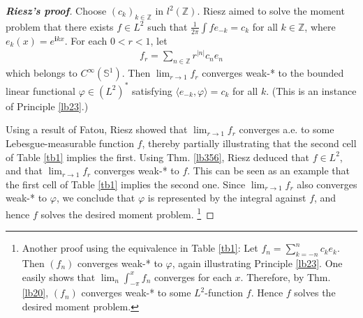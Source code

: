\documentclass[12pt,b5paper,notitlepage]{article}
\theoremstyle{definition}
\theoremstyle{plain}
\newcommand{\bk}[1]{\langle {#1}\rangle}
\newcommand{\im}{\mathbf{i}}
\newcommand{\Zbb}{\mathbb Z}
\newcommand{\Sbb}{{\mathbb S}}
\numberwithin{equation}{section}
\begin{document}
\begin{proof}[\textbf{Riesz's proof}]
Choose $(c_k)_{k\in\Zbb}$ in $l^2(\Zbb)$. Riesz aimed to solve the moment problem that there exists $f\in L^2$ such that $\frac{1}{2\pi}\int fe_{-k}=c_k$ for all $k\in\Zbb$, where $e_k(x)=e^{\im kx}$. For each $0<r<1$, let
\begin{align*}
f_r=\sum_{n\in\Zbb}r^{|n|}c_ne_n
\end{align*}
which belongs to $C^\infty(\Sbb^1)$. Then $\lim_{r\rightarrow 1}f_r$ converges weak-* to the bounded linear functional $\varphi\in (L^2)^*$ satisfying $\bk{e_{-k},\varphi}=c_k$ for all $k$. (This is an instance of Principle \ref{lb23}.) %


Using a result of Fatou, Riesz showed that $\lim_{r\rightarrow 1}f_r$ converges a.e. to some Lebesgue-measurable function $f$, thereby partially illustrating that the second cell of Table \ref{tb1} implies the first. %
Using Thm. \ref{lb356}, Riesz deduced that $f\in L^2$, and that $\lim_{r\rightarrow 1}f_r$ converges weak-* to $f$. This can be seen as an example that the first cell of Table \ref{tb1} implies the second one. Since $\lim_{r\rightarrow 1}f_r$ also converges weak-* to $\varphi$, we conclude that $\varphi$ is represented by the integral against $f$, and hence $f$ solves the desired moment problem. \footnote{Another proof using the equivalence in Table \ref{tb1}: Let $f_n=\sum_{k=-n}^n c_ke_k$. Then $(f_n)$ converges weak-* to $\varphi$, again illustrating Principle \ref{lb23}. One easily shows that $\lim_n\int_{-\pi}^xf_n$ converges for each $x$. Therefore, by Thm. \ref{lb20}, $(f_n)$ converges weak-* to some $L^2$-function $f$. Hence $f$ solves the desired moment problem.}
\end{proof}

\end{document}
